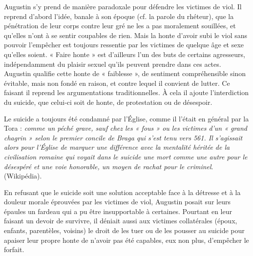  Augustin s'y prend de manière paradoxale pour défendre les victimes de viol. Il reprend d'abord l'idée, banale à son époque (cf. la parole du rhéteur), que la pénétration de leur corps contre leur gré ne les a pas moralement souillées, et qu'elles n'ont à se sentir coupables de rien. Mais la honte d'avoir subi le viol sans pouvoir l'empêcher est toujours ressentie par les victimes de quelque âge et sexe qu'elles soient. « Faire honte » est d'ailleurs l'un des buts de certains agresseurs, indépendamment du plaisir sexuel qu'ils peuvent prendre dans ces actes. Augustin qualifie cette honte de « faiblesse », de sentiment compréhensible sinon évitable, mais non fondé en raison, et contre lequel il convient de lutter. Ce faisant il reprend les argumentations traditionnelles. À cela il ajoute l'interdiction du suicide, que celui-ci soit de honte, de protestation ou de désespoir. 

 Le suicide a toujours été condamné par l'Église, comme il l'était en général par la Tora : \emph{comme un péché grave, sauf chez les « fous » ou les victimes d'un « grand chagrin » selon le \emph{premier concile de Braga} qui s'est tenu vers 561. Il s'agissait alors pour l'Église de marquer une différence avec la mentalité héritée de la civilisation romaine qui voyait dans le suicide une mort comme une autre pour le désespéré et une voie honorable, un moyen de rachat pour le criminel}. (Wikipédia). 

 En refusant que le suicide soit une solution acceptable face à la détresse et à la douleur morale éprouvées par les victimes de viol, Augustin posait sur leurs épaules un fardeau qui a pu être insupportable à certaines. Pourtant en leur faisant un devoir de survivre, il déniait aussi aux victimes collatérales (époux, enfants, parentèles, voisins) le droit de les tuer ou de les pousser au suicide pour apaiser leur propre honte de n'avoir pas été capables, eux non plus, d'empêcher le forfait.
 
 